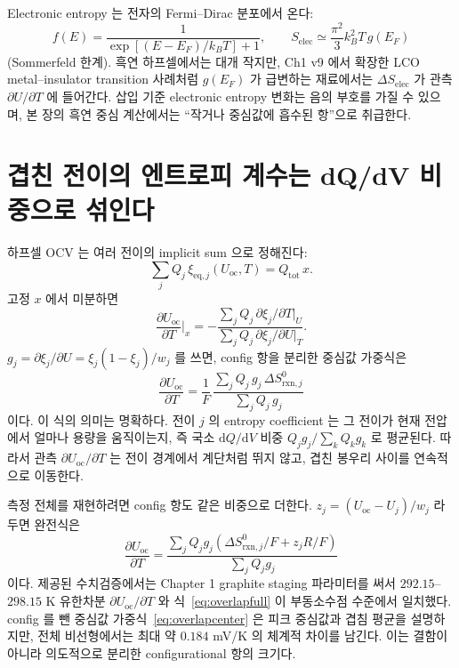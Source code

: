 \documentclass[11pt,a4paper]{article}
\newcommand{\dd}{\mathrm{d}}
\newcommand{\rxn}{\mathrm{rxn}}
\newcommand{\eq}{\mathrm{eq}}
\newcommand{\oc}{\mathrm{oc}}
\newcommand{\elec}{\mathrm{elec}}
\begin{document}
Electronic entropy 는 전자의 Fermi--Dirac 분포에서 온다:
\begin{equation}
f(E)=\frac{1}{\exp[(E-E_F)/k_B T]+1},\qquad
S_{\elec}\simeq\frac{\pi^2}{3}k_B^2T\,g(E_F)
\label{eq:electronic}
\end{equation}
(Sommerfeld 한계). 흑연 하프셀에서는 대개 작지만, Ch1 v9 에서 확장한 LCO metal--insulator transition
사례처럼 $g(E_F)$ 가 급변하는 재료에서는 $\Delta S_{\elec}$ 가 관측 $\partial U/\partial T$ 에 들어간다.
삽입 기준 electronic entropy 변화는 음의 부호를 가질 수 있으며, 본 장의 흑연 중심 계산에서는 ``작거나
중심값에 흡수된 항''으로 취급한다.

\section{겹친 전이의 엔트로피 계수는 dQ/dV 비중으로 섞인다}\label{sec:overlap}
하프셀 OCV 는 여러 전이의 implicit sum 으로 정해진다:
\begin{equation}
\sum_j Q_j\,\xi_{\eq,j}(U_\oc,T)=Q_{\mathrm{tot}}\,x.
\label{eq:implicit}
\end{equation}
고정 $x$ 에서 미분하면
\begin{equation}
\frac{\partial U_\oc}{\partial T}\bigg|_x
=-\frac{\sum_j Q_j\,\partial\xi_j/\partial T|_U}
        {\sum_j Q_j\,\partial\xi_j/\partial U|_T}.
\label{eq:implicitdiff}
\end{equation}
$g_j=\partial\xi_j/\partial U=\xi_j(1-\xi_j)/w_j$ 를 쓰면, config 항을 분리한 중심값 가중식은
\begin{equation}
\boxed{\;
\frac{\partial U_\oc}{\partial T}
=\frac{1}{F}\,
\frac{\sum_j Q_j\,g_j\,\Delta S^0_{\rxn,j}}
     {\sum_j Q_j\,g_j}
\;}
\label{eq:overlapcenter}
\end{equation}
이다. 이 식의 의미는 명확하다. 전이 $j$ 의 entropy coefficient 는 그 전이가 현재 전압에서 얼마나
용량을 움직이는지, 즉 국소 $\dd Q/\dd V$ 비중 $Q_jg_j/\sum_k Q_kg_k$ 로 평균된다. 따라서 관측
$\partial U_\oc/\partial T$ 는 전이 경계에서 계단처럼 뛰지 않고, 겹친 봉우리 사이를 연속적으로 이동한다.

측정 전체를 재현하려면 config 항도 같은 비중으로 더한다. $z_j=(U_\oc-U_j)/w_j$ 라 두면 완전식은
\begin{equation}
\boxed{\;
\frac{\partial U_\oc}{\partial T}
=\frac{\sum_j Q_jg_j\left(\Delta S^0_{\rxn,j}/F+z_jR/F\right)}
       {\sum_j Q_jg_j}
\;}
\label{eq:overlapfull}
\end{equation}
이다. 제공된 수치검증에서는 Chapter 1 graphite staging 파라미터를 써서 $292.15$--$298.15$ K 유한차분
$\partial U_\oc/\partial T$ 와 식~\eqref{eq:overlapfull} 이 부동소수점 수준에서 일치했다. config 를 뺀
중심값 가중식~\eqref{eq:overlapcenter} 은 피크 중심값과 겹침 평균을 설명하지만, 전체 비선형에서는
최대 약 $0.184$ mV/K 의 체계적 차이를 남긴다. 이는 결함이 아니라 의도적으로 분리한 configurational
항의 크기다.
\end{document}
